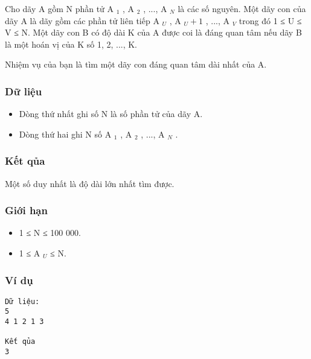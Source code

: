 



   Cho dãy A gồm N phần tử A   $_    1   $   , A   $_    2   $   , ..., A   $_    N   $   là các số nguyên. Một dãy con của dãy A là dãy gồm các phần tử liên tiếp A   $_    U   $   , A   $_    U+1   $   , ...,   A   $_    V   $   trong đó 1 ≤ U ≤ V ≤ N. Một dãy con B có độ dài K của A được coi là đáng quan tâm nếu dãy B là một hoán vị của K số 1, 2, ..., K.  

   Nhiệm vụ của bạn là tìm một dãy con đáng quan tâm dài nhất của A.  

\subsubsection{   Dữ liệu  }
\begin{itemize}
	\item     Dòng thứ nhất ghi số N là số phần tử của dãy A.   
	\item     Dòng thứ hai ghi N số A    $_     1    $    , A    $_     2    $    , ...,  A    $_     N    $    .   
\end{itemize}

\subsubsection{   Kết qủa  }

   Một số duy nhất là độ dài lớn nhất tìm được.  

\subsubsection{   Giới hạn  }
\begin{itemize}
	\item     1 ≤ N ≤ 100 000.   
	\item     1 ≤ A    $_     U    $    ≤ N.   
\end{itemize}

\subsubsection{   Ví dụ  }
\begin{verbatim}
Dữ liệu:
5
4 1 2 1 3

Kết qủa
3
\end{verbatim}